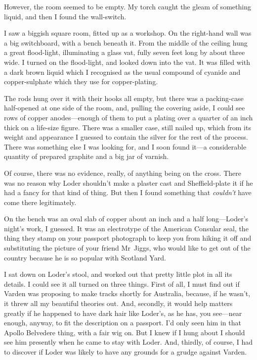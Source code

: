 However, the room seemed to be empty. My torch caught the gleam of something liquid, and then I found the wall-switch.

I saw a biggish square room, fitted up as a workshop. On the right-hand wall was a big switchboard, with a bench beneath it. From the middle of the ceiling hung a great flood-light, illuminating a glass vat, fully seven feet long by about three wide. I turned on the flood-light, and looked down into the vat. It was filled with a dark brown liquid which I recognised as the usual compound of cyanide and copper-sulphate which they use for copper-plating.

The rods hung over it with their hooks all empty, but there was a packing-case half-opened at one side of the room, and, pulling the covering aside, I could see rows of copper anodes—enough of them to put a plating over a quarter of an inch thick on a life-size figure. There was a smaller case, still nailed up, which from its weight and appearance I guessed to contain the silver for the rest of the process. There was something else I was looking for, and I soon found it—a considerable quantity of prepared graphite and a big jar of varnish.

Of course, there was no evidence, really, of anything being on the cross. There was no reason why Loder shouldn't make a plaster cast and Sheffield-plate it if he had a fancy for that kind of thing. But then I found something that \emph{couldn't} have come there legitimately.

On the bench was an oval slab of copper about an inch and a half long—Loder's night's work, I guessed. It was an electrotype of the American Consular seal, the thing they stamp on your passport photograph to keep you from hiking it off and substituting the picture of your friend Mr~Jiggs, who would like to get out of the country because he is so popular with Scotland Yard.

I sat down on Loder's stool, and worked out that pretty little plot in all its details. I could see it all turned on three things. First of all, I must find out if Varden was proposing to make tracks shortly for Australia, because, if he wasn't, it threw all my beautiful theories out. And, secondly, it would help matters greatly if he happened to have dark hair like Loder's, as he has, you see—near enough, anyway, to fit the description on a passport. I'd only seen him in that Apollo Belvedere thing, with a fair wig on. But I knew if I hung about I should see him presently when he came to stay with Loder. And, thirdly, of course, I had to discover if Loder was likely to have any grounds for a grudge against Varden.

